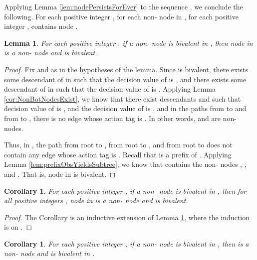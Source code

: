 \documentclass[11pt]{article}
\numberwithin{theorem}{section}
\newtheorem{lemma}[theorem]{Lemma}
\newtheorem{corollary}[theorem]{Corollary}
\begin{document}
Applying Lemma \ref{lem:nodePersistsForEver} to the sequence , we conclude the following. For each positive integer , for each non- node  in , for each positive integer ,  contains node .

\begin{lemma}\label{lem:bivalentNodeStableInNextG}
For each positive integer , if a non- node  is bivalent in , then  node  in  is a non- node and is bivalent.
\end{lemma}
\begin{proof}
Fix  and  as in the hypotheses of the lemma.  
Since  is bivalent, there exists some descendant  of  in  such that the decision value of  is , and there exists some descendant  of  in  such that the decision value of  is . Applying Lemma \ref{cor:NonBotNodesExist}, we know that there exist descendants  and  such that decision value of  is , and the decision value of  is , and in the paths from  to  and from  to , there is no edge whose action tag is . In other words,  and  are non- nodes. 

Thus, in , the path from root to , from root to , and from root to  does not contain any edge whose action tag is . Recall that  is a prefix of . 
Applying Lemma \ref{lem:prefixObsYieldsSubtree}, we know that  contains the non- nodes , , and . That is, node  in  is bivalent.
\end{proof}

\begin{corollary}\label{cor:bivalentNodeStableInNextG}
For each positive integer , if a non- node  is bivalent in , then for all positive integers , node  in  is a non- node and is bivalent.
\end{corollary}
\begin{proof}
The Corollary is an inductive extension of Lemma \ref{lem:bivalentNodeStableInNextG}, where the induction is on .
\end{proof}

\begin{corollary}\label{cor:bivalentNodeStableInAllGs}
For each positive integer , if a non- node  is bivalent in , then  is a non- node and is bivalent in .
\end{corollary}
\end{document}

